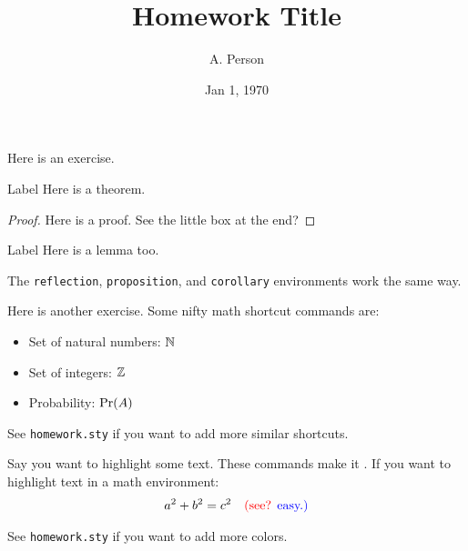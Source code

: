 \documentclass[12pt]{article}
\begin{document}
\title{Homework Title}
\author{A. Person}
\date{Jan 1, 1970}

\maketitle

\begin{exercise}{1} %
    Here is an exercise.

    \begin{theorem}{Label}
        Here is a theorem.
    \end{theorem}

    \begin{proof}
        Here is a proof.
        See the little box at the end?
    \end{proof}

    \begin{lemma}{Label}
        Here is a lemma too.
    \end{lemma}

    The \texttt{reflection}, \texttt{proposition}, and \texttt{corollary} environments work the same way.
\end{exercise}

\begin{exercise}{2}
    Here is another exercise.
    Some nifty math shortcut commands are:
    \begin{itemize}
        \item Set of natural numbers: $\mathbb{N}$
        \item Set of integers: $\mathbb{Z}$
        \item Probability: $\mathrm{Pr}(A)$
    \end{itemize}

    See \texttt{homework.sty} if you want to add more similar shortcuts.

    Say you want to highlight some text. These commands make it  .
    If you want to highlight text in a math environment:
    \begin{align*}
        a^2 + b^2 = c^2 \quad {\text{\color{red}(see? }} {\text{\color{blue}easy.)}}
    \end{align*}

    See \texttt{homework.sty} if you want to add more colors.
    
    
\end{exercise}
\end{document}
